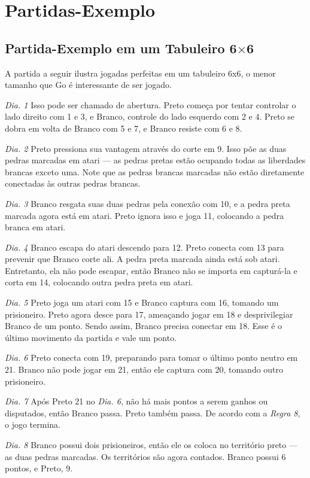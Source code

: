 \chapter{Partidas-Exemplo}\label{chap:cinco}

\section{Partida-Exemplo em um Tabuleiro \texorpdfstring{6$\times$6}{6x6}}

A partida a seguir ilustra jogadas perfeitas em um tabuleiro 6x6, o menor tamanho que Go é interessante de ser jogado.

\emph{Dia. 1} Isso pode ser chamado de abertura. Preto começa por tentar controlar o lado direito com 1 e 3, e Branco, controle do lado esquerdo com 2 e 4. Preto se dobra em volta de Branco com 5 e 7, e Branco resiste com 6 e 8.

\emph{Dia. 2} Preto pressiona sua vantagem através do corte em 9. Isso põe as duas pedras marcadas em atari --- as pedras pretas estão ocupando todas as liberdades brancas exceto uma. Note que as pedras brancas marcadas não estão diretamente conectadas às outras pedras brancas.

\emph{Dia. 3} Branco resgata suas duas pedras pela conexão com 10, e a pedra preta marcada agora está em atari. Preto ignora isso e joga 11, colocando a pedra branca em atari.

\emph{Dia. 4} Branco escapa do atari descendo para 12. Preto conecta com 13 para prevenir que Branco corte ali. A pedra preta marcada ainda está sob atari. Entretanto, ela não pode escapar, então Branco não se importa em capturá-la e corta em 14, colocando outra pedra preta em atari.

\emph{Dia. 5} Preto joga um atari com 15 e Branco captura com 16, tomando um prisioneiro. Preto agora desce para 17, ameaçando jogar em 18 e desprivilegiar Branco de um ponto. Sendo assim, Branco precisa conectar em 18. Esse é o último movimento da partida e vale um ponto.

\emph{Dia. 6} Preto conecta com 19, preparando para tomar o último ponto neutro em 21. Branco não pode jogar em 21, então ele captura com 20, tomando outro prisioneiro.

\emph{Dia. 7} Após Preto 21 no \emph{Dia. 6}, não há mais pontos a serem ganhos ou disputados, então Branco passa. Preto também passa. De acordo com a \emph{Regra 8}, o jogo termina.

\emph{Dia. 8} Branco possui dois prisioneiros, então ele os coloca no território preto --- as duas pedras marcadas. Os territórios são agora contados. Branco possui 6 pontos, e Preto, 9.

